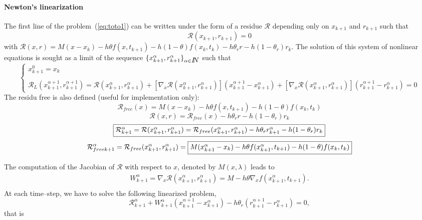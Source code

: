  \paragraph{Newton's linearization} The first line of the  problem~(\ref{eq:toto1}) can be written under the form of a residue $\mathcal R$ depending only on $x_{k+1}$ and $r_{k+1}$ such that 
\begin{equation}
  \label{eq:NL3}
  \mathcal R (x_{k+1},r _{k+1}) =0
\end{equation}
with $\mathcal R(x,r) = M (x - x_{k}) -h\theta f( x , t_{k+1}) - h(1-\theta)f(x_k,t_k) - h\theta _r r
- h(1-\theta_r)r_k$.
The solution of this system of nonlinear equations is sought as a limit of the sequence $\{ x^{\alpha}_{k+1},r^{\alpha}_{k+1} \}_{\alpha \in \mbox{\rm $I\!\!N$}}$ such that
 \begin{equation}
   \label{eq:NL7}
   \begin{cases}
     x^{0}_{k+1} = x_k \\ \\
     \mathcal R_L( x^{\alpha+1}_{k+1},r^{\alpha+1}_{k+1}) = \mathcal
     R(x^{\alpha}_{k+1},r^{\alpha}_{k+1})  + \left[ \nabla_{x} \mathcal
     R(x^{\alpha}_{k+1},r^{\alpha}_{k+1})\right] (x^{\alpha+1}_{k+1}-x^{\alpha}_{k+1} ) +
     \left[ \nabla_{x} \mathcal R(x^{\alpha}_{k+1},r^{\alpha}_{k+1})\right] (r^{\alpha+1}_{k+1} - r^{\alpha}_{k+1} ) =0
 \end{cases}
\end{equation}
The residu free is also defined (useful for implementation only):
\[\mathcal R _{free}(x) =  M (x - x_{k}) -h\theta f( x , t_{k+1}) - h(1-\theta)f(x_k,t_k)\]
\[\mathcal R (x,r) = \mathcal R _{free}(x)   - h\theta _r r - h(1-\theta_r)r_k\]
\[ \fbox{$\mathcal R^{\alpha}_{k+1} = \mathcal R (x^{\alpha}_{k+1},r^{\alpha}_{k+1}) = \mathcal R
_{free}(x^{\alpha}_{k+1},r^{\alpha}_{k+1} )  - h\theta _r r^{\alpha}_{k+1} - h(1-\theta_r)r_k$}\]
\[ \mathcal R _{free k+1} ^{\alpha} = \mathcal R
_{free}(x^{\alpha}_{k+1},r^{\alpha}_{k+1} )=\fbox{$M(x^{\alpha}_{k+1} - x_{k}) -h\theta f( x^{\alpha}_{k+1} , t_{k+1}) - h(1-\theta)f(x_k,t_k)$}\]
 
The computation of the Jacobian of $\mathcal R$ with respect to $x$, denoted by $M(x,\lambda)$ leads to 
\begin{equation}
   \label{eq:NL9}
   \begin{array}{l}
    W^{\alpha}_{k+1}= \nabla_{x} \mathcal R (x^{\alpha}_{k+1},r^{\alpha}_{k+1})= M - h  \theta \nabla_{x} f(  x^{\alpha}_{k+1}, t_{k+1} ).\\
 \end{array}
\end{equation}
At each time--step, we have to solve the following linearized problem,
\begin{equation}
   \label{eq:NL10}
    \mathcal R^{\alpha}_{k+1} + W^{\alpha}_{k+1} (x^{\alpha+1}_{k+1} -
    x^{\alpha}_{k+1}) - h \theta _r (r^{\alpha+1}_{k+1} - r^{\alpha}_{k+1} )  =0 ,
\end{equation}
that is

